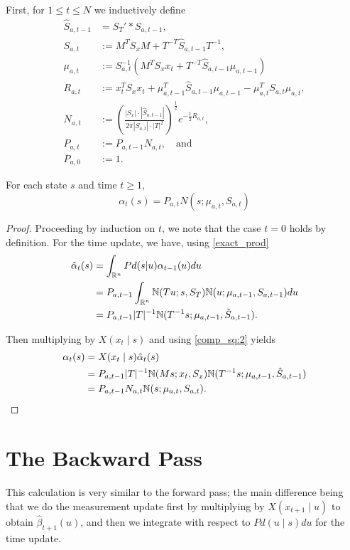 \documentclass[12pt,leqno]{article}
\begin{document}
  First, for $1\le t \le N$ we inductively define
  \begin{align*}
    \hat{S}_{a,t-1} &= S_T'*S_{a,t-1},\\
    S_{a,t} &:= M^TS_xM  +T^{-T} \hat{S}_{a,t-1}T^{-1},\\
    \mu_{a,t} &:= S_{a,t}^{-1}(M^TS_xx_t + T^{-T}\hat{S}_{a,t-1}\mu_{a,t-1})\\
    R_{a,t} &:= x_t^TS_xx_t + \mu_{a,t-1}^T\hat{S}_{a,t-1}\mu_{a,t-1} - \mu_{a,t}^TS_{a,t}\mu_{a,t},\\
    N_{a,t} &:= \left(\frac{|S_x|\cdot|\hat{S}_{a,t-1}|}{2\pi|S_{a,t}|\cdot|T|^2}\right)^{\frac{1}{2}}e^{-\frac{1}{2}R_{a,t}},\\
    P_{a,t} &:= P_{a,t-1}N_{a,t}, \quad\text{and}\\
    P_{a,0} &:= 1.
  \end{align*}

\begin{Thm}\label{alpha:1}
  For each state $s$ and time $t \ge 1$,
$$
  \alpha_t(s) = P_{a,t}N(s;\mu_{a,t},S_{a,t})
$$
\end{Thm}

\begin{proof}

Proceeding by induction on $t$, we note that the case $t = 0$ holds by definition.
For the time update, we have, using \eqref{exact_prod}
\begin{align}
  \hat{\alpha}_t(s) &= \int_{{\mathbb R}^n}Pd(s|u)\alpha_{t-1}(u)du \\\notag
  &= P_{a,t-1}\int_{{\mathbb R}^n}{\mathbb N}(Tu;s,S_T){\mathbb N}(u;\mu_{a,t-1},S_{a,t-1})du \notag\\
  &= P_{a,t-1}|T|^{-1}{\mathbb N}(T^{-1}s;\mu_{a,t-1},\hat{S}_{a,t-1}).
\end{align}

Then multiplying by $X(x_t\mid s)$ and using \eqref{comp_sq:2} yields
\begin{align*}
  \alpha_t(s) &= X(x_t\mid s)\hat{\alpha}_t(s) \\
  &= P_{a,t-1}|T|^{-1}{\mathbb N}(Ms;x_t,S_x){\mathbb N}(T^{-1}s;\mu_{a,t-1},\hat{S}_{a,t-1}) \\
  &= P_{a,t-1}N_{a,t}{\mathbb N}(s;\mu_{a,t},S_{a,t}).
\end{align*}
\end{proof}

\section{The Backward Pass}
This calculation is very similar to the forward pass; the main difference being that we do
the measurement update first by multiplying by $X(x_{t+1}\mid u)$ to obtain $\hat{\beta}_{t+1}(u)$,
and then we integrate with respect to $Pd(u\mid s)du$ for the time update.  
\end{document}
